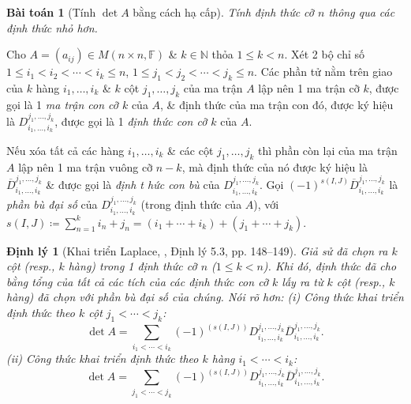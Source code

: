 \documentclass{article}
\newtheorem{baitoan}{Bài toán}
\newtheorem{dinhly}{Định lý}
\begin{document}
\begin{baitoan}[Tính $\det A$ bằng cách hạ cấp]
	Tính định thức cỡ $n$ thông qua các định thức nhỏ hơn.
\end{baitoan}
Cho $A = (a_{ij})\in M(n\times n,\mathbb{F})$ \& $k\in\mathbb{N}$ thỏa $1\le k < n$. Xét 2 bộ chỉ số $1\le i_1 < i_2 < \cdots < i_k\le n$, $1\le j_1 < j_2 < \cdots < j_k\le n$. Các phần tử nằm trên giao của $k$ hàng $i_1,\ldots,i_k$ \& $k$ cột $j_1,\ldots,j_k$ của ma trận $A$ lập nên 1 ma trận cỡ $k$, được gọi là 1 {\it ma trận con cỡ $k$} của $A$, \& định thức của ma trận con đó, được ký hiệu là $D_{i_1,\ldots,i_k}^{j_1,\ldots,j_k}$, được gọi là 1 {\it định thức con cỡ $k$} của $A$.

Nếu xóa tất cả các hàng $i_1,\ldots,i_k$ \& các cột $j_1,\ldots,j_k$ thì phần còn lại của ma trận $A$ lập nên 1 ma trận vuông cỡ $n - k$, mà định thức của nó được ký hiệu là $\overline{D}_{i_1,\ldots,i_k}^{j_1,\ldots,j_k}$ \& được gọi là {\it định t hức con bù} của $D_{i_1,\ldots,i_k}^{j_1,\ldots,j_k}$. Gọi $(-1)^{s(I,J)}\overline{D}_{i_1,\ldots,i_k}^{j_1,\ldots,j_k}$ là {\it phần bù đại số} của $D_{i_1,\ldots,i_k}^{j_1,\ldots,j_k}$ (trong định thức của $A$), với $s(I,J)\coloneqq\sum_{n=1}^k i_n + j_n = (i_1 + \cdots + i_k) + (j_1 + \cdots + j_k)$.

\begin{dinhly}[Khai triển Laplace, \cite{Hung_linear_algebra}, Định lý 5.3, pp. 148--149]
	Giả sử đã chọn ra $k$ cột (resp., $k$ hàng) trong 1 định thức cỡ $n$ ($1\le k < n$). Khi đó, định thức đã cho bằng tổng của tất cả các tích của các định thức con cỡ $k$ lấy ra từ $k$ cột (resp., $k$ hàng) đã chọn với phần bù đại số của chúng. Nói rõ hơn: (i) Công thức khai triển định thức theo $k$ cột $j_1 < \cdots < j_k$:
	\begin{equation*}
		\det A = \sum_{i_1 < \cdots < i_k} (-1)^{(s(I,J))}D_{i_1,\ldots,i_k}^{j_1,\ldots,j_k}\overline{D}_{i_1,\ldots,i_k}^{j_1,\ldots,j_k}.
	\end{equation*}
	(ii) Công thức khai triển định thức theo $k$ hàng $i_1 < \cdots < i_k$:
	\begin{equation*}
		\det A = \sum_{j_1 < \cdots < j_k} (-1)^{(s(I,J))}D_{i_1,\ldots,i_k}^{j_1,\ldots,j_k}\overline{D}_{i_1,\ldots,i_k}^{j_1,\ldots,j_k}.
	\end{equation*}
\end{dinhly}
\end{document}
